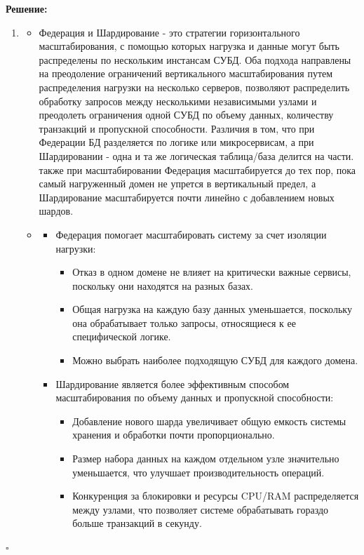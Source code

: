 \documentclass[12pt]{article}
\newenvironment{solution}
{
  \par\textbf{Решение:}\par\bigbreak
  \begingroup
}
{
  \par\bigbreak\hfill$\square$%
  \par\endgroup
}
\begin{document}
\begin{solution}
		\begin{enumerate}
        \item \begin{itemize}
        \item Федерация и Шардирование - это стратегии горизонтального масштабирования, с помощью которых нагрузка и данные могут быть распределены по нескольким инстансам СУБД. Оба подхода направлены на преодоление ограничений вертикального масштабирования путем распределения нагрузки на несколько серверов, позволяют распределить обработку запросов между несколькими независимыми узлами и преодолеть ограничения одной СУБД по объему данных, количеству транзакций и пропускной способности. Различия в том, что при Федерации БД разделяется по логике или микросервисам, а при Шардировании - одна и та же логическая таблица/база делится на части. также при масштабировании Федерация масштабируется до тех пор, пока самый нагруженный домен не упрется в вертикальный предел, а Шардирование масштабируется почти линейно с добавлением новых шардов.
        \item 
        \begin{itemize}
        \item Федерация помогает масштабировать систему за счет изоляции нагрузки: 
            \begin{itemize}
              \item Отказ в одном домене не влияет на критически важные сервисы, поскольку они находятся на разных базах.
              \item Общая нагрузка на каждую базу данных уменьшается, поскольку она обрабатывает только запросы, относящиеся к ее специфической логике.
              \item Можно выбрать наиболее подходящую СУБД для каждого домена.
            \end{itemize}
            \item Шардирование является более эффективным способом масштабирования по объему данных и пропускной способности:
            \begin{itemize}
              \item Добавление нового шарда увеличивает общую емкость системы хранения и обработки почти пропорционально.
              \item Размер набора данных на каждом отдельном узле значительно уменьшается, что улучшает производительность операций.
              \item Конкуренция за блокировки и ресурсы CPU/RAM распределяется между узлами, что позволяет системе обрабатывать гораздо больше транзакций в секунду.

\end{itemize}
\end{itemize}
\end{itemize}
\end{enumerate}
\end{solution}
\end{document}
